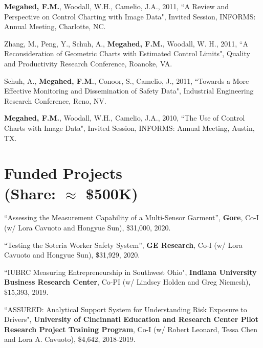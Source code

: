 \documentclass[margin,line]{res}
\begin{document}
\begin{resume}
\vspace{-1.5mm}
\textbf{Megahed, F.M.}, Woodall, W.H., Camelio, J.A., 2011, ``A Review and Perspective on Control Charting with Image Data", Invited Session, INFORMS: Annual Meeting, Charlotte, NC.

\vspace{-1.5mm}
Zhang, M., Peng, Y., Schuh, A., \textbf{Megahed, F.M.}, Woodall, W. H., 2011, ``A Reconsideration of Geometric Charts with Estimated Control Limits", Quality and Productivity Research Conference, Roanoke, VA.

\vspace{-1.5mm}
Schuh, A., \textbf{Megahed, F.M.}, Conoor, S., Camelio, J., 2011, ``Towards a More Effective Monitoring and Dissemination of Safety Data", Industrial Engineering Research Conference, Reno, NV.

\vspace{-1.5mm}
\textbf{Megahed, F.M.}, Woodall, W.H., Camelio, J.A., 2010, ``The Use of Control Charts with Image Data", Invited Session, INFORMS: Annual Meeting, Austin, TX. 

\newpage 

\section{\sc Funded Projects \\ (Share: $\approx$ \$500K)}

``Assessing the Measurement Capability of a Multi-Sensor Garment'', \textbf{Gore}, Co-I (w/ Lora Cavuoto and Hongyue Sun), \$31,000, 2020.

\vspace{-1.5mm}
``Testing the Soteria Worker Safety System'', \textbf{GE Research}, Co-I (w/ Lora Cavuoto and Hongyue Sun), \$31,929, 2020.

\vspace{-1.5mm}
``IUBRC Measuring Entrepreneurship in Southwest Ohio", \textbf{Indiana University Business Research Center}, Co-PI (w/ Lindsey Holden and Greg Niemesh), \$15,393, 2019.


\vspace{-1.5mm}
``ASSURED: Analytical Support System for Understanding Risk Exposure to Drivers", \textbf{University of Cincinnati Education and Research Center Pilot Research Project Training Program}, Co-I (w/ Robert Leonard, Tessa Chen and Lora A. Cavuoto), \$4,642, 2018-2019.


\end{resume}
\end{document}
